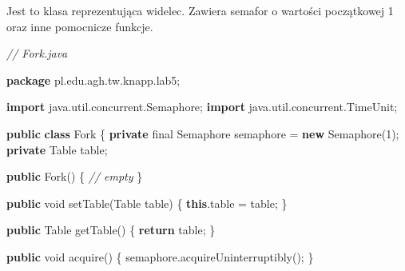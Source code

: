\documentclass[11pt]{article}
\newenvironment{Shaded}{}{}
\newcommand{\KeywordTok}[1]{\textcolor[rgb]{0.00,0.44,0.13}{\textbf{{#1}}}}
\newcommand{\DataTypeTok}[1]{\textcolor[rgb]{0.56,0.13,0.00}{{#1}}}
\newcommand{\DecValTok}[1]{\textcolor[rgb]{0.25,0.63,0.44}{{#1}}}
\newcommand{\CommentTok}[1]{\textcolor[rgb]{0.38,0.63,0.69}{\textit{{#1}}}}
\newcommand{\FunctionTok}[1]{\textcolor[rgb]{0.02,0.16,0.49}{{#1}}}
\newcommand{\NormalTok}[1]{{#1}}
\newcommand{\ImportTok}[1]{{#1}}
\newcommand{\ControlFlowTok}[1]{\textcolor[rgb]{0.00,0.44,0.13}{\textbf{{#1}}}}
\newcommand{\OperatorTok}[1]{\textcolor[rgb]{0.40,0.40,0.40}{{#1}}}
\newcommand{\BuiltInTok}[1]{{#1}}
\begin{document}
Jest to klasa reprezentująca widelec. Zawiera semafor o wartości
początkowej 1 oraz inne pomocnicze funkcje.

\begin{Shaded}
\begin{Highlighting}[]
\CommentTok{// Fork.java}

\KeywordTok{package}\ImportTok{ pl}\OperatorTok{.}\ImportTok{edu}\OperatorTok{.}\ImportTok{agh}\OperatorTok{.}\ImportTok{tw}\OperatorTok{.}\ImportTok{knapp}\OperatorTok{.}\ImportTok{lab5}\OperatorTok{;}

\KeywordTok{import} \ImportTok{java}\OperatorTok{.}\ImportTok{util}\OperatorTok{.}\ImportTok{concurrent}\OperatorTok{.}\ImportTok{Semaphore}\OperatorTok{;}
\KeywordTok{import} \ImportTok{java}\OperatorTok{.}\ImportTok{util}\OperatorTok{.}\ImportTok{concurrent}\OperatorTok{.}\ImportTok{TimeUnit}\OperatorTok{;}

\KeywordTok{public} \KeywordTok{class}\NormalTok{ Fork }\OperatorTok{\{}
    \KeywordTok{private} \DataTypeTok{final} \BuiltInTok{Semaphore}\NormalTok{ semaphore }\OperatorTok{=} \KeywordTok{new} \BuiltInTok{Semaphore}\OperatorTok{(}\DecValTok{1}\OperatorTok{);}
    \KeywordTok{private}\NormalTok{ Table table}\OperatorTok{;}

    \KeywordTok{public} \FunctionTok{Fork}\OperatorTok{()} \OperatorTok{\{}
        \CommentTok{// empty}
    \OperatorTok{\}}

    \KeywordTok{public} \DataTypeTok{void} \FunctionTok{setTable}\OperatorTok{(}\NormalTok{Table table}\OperatorTok{)} \OperatorTok{\{}
        \KeywordTok{this}\OperatorTok{.}\FunctionTok{table} \OperatorTok{=}\NormalTok{ table}\OperatorTok{;}
    \OperatorTok{\}}

    \KeywordTok{public}\NormalTok{ Table }\FunctionTok{getTable}\OperatorTok{()} \OperatorTok{\{}
        \ControlFlowTok{return}\NormalTok{ table}\OperatorTok{;}
    \OperatorTok{\}}

    \KeywordTok{public} \DataTypeTok{void} \FunctionTok{acquire}\OperatorTok{()} \OperatorTok{\{}
\NormalTok{        semaphore}\OperatorTok{.}\FunctionTok{acquireUninterruptibly}\OperatorTok{();}
    \OperatorTok{\}}


\end{Highlighting}
\end{Shaded}
\end{document}
